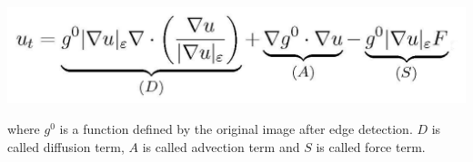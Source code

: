 \begin{center}
\includegraphics{Text/IMG/maca.png}
\end{center}
where $g^{0}$ is a function defined by the original image after edge detection. $D$ is called diffusion term, $A$ is called advection term and $S$ is called force term.

